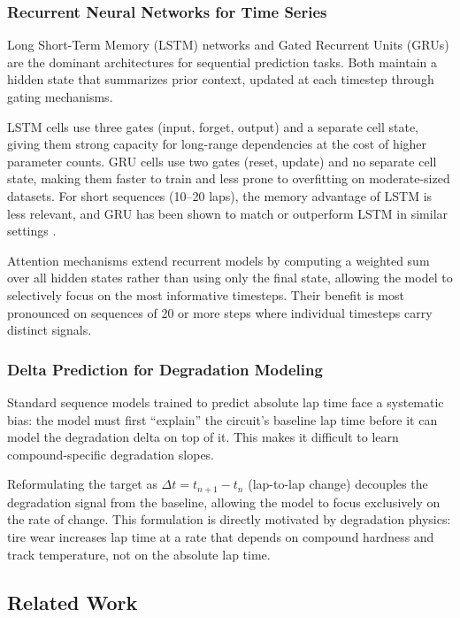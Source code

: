 \documentclass[12pt]{article}
\begin{document}
\subsubsection{Recurrent Neural Networks for Time Series}

Long Short-Term Memory (LSTM) networks \cite{hochreiter1997} and Gated Recurrent Units (GRUs) \cite{cho2014} are the dominant architectures for sequential prediction tasks. Both maintain a hidden state that summarizes prior context, updated at each timestep through gating mechanisms.

LSTM cells use three gates (input, forget, output) and a separate cell state, giving them strong capacity for long-range dependencies at the cost of higher parameter counts. GRU cells use two gates (reset, update) and no separate cell state, making them faster to train and less prone to overfitting on moderate-sized datasets. For short sequences (10--20 laps), the memory advantage of LSTM is less relevant, and GRU has been shown to match or outperform LSTM in similar settings \cite{chung2014}.

Attention mechanisms \cite{bahdanau2015} extend recurrent models by computing a weighted sum over all hidden states rather than using only the final state, allowing the model to selectively focus on the most informative timesteps. Their benefit is most pronounced on sequences of 20 or more steps where individual timesteps carry distinct signals.

\subsubsection{Delta Prediction for Degradation Modeling}

Standard sequence models trained to predict absolute lap time face a systematic bias: the model must first ``explain'' the circuit's baseline lap time before it can model the degradation delta on top of it. This makes it difficult to learn compound-specific degradation slopes.

Reformulating the target as $\Delta t = t_{n+1} - t_n$ (lap-to-lap change) decouples the degradation signal from the baseline, allowing the model to focus exclusively on the rate of change. This formulation is directly motivated by degradation physics: tire wear increases lap time at a rate that depends on compound hardness and track temperature, not on the absolute lap time.

\subsection{Related Work}
\end{document}
